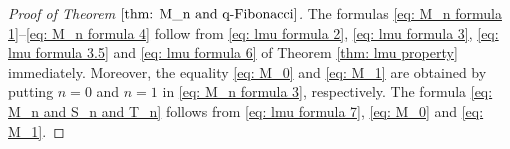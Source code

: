\documentclass[a4paper]{article}
\numberwithin{equation}{section}
\theoremstyle{plain}
\newtheorem{lem}{Lemma}
\newtheorem{coro}{Corollary}
\begin{document}
\begin{proof}[Proof of Theorem $\ref{thm: M_n and q-Fibonacci}$]
The formulas \eqref{eq: M_n formula 1}--\eqref{eq: M_n formula 4} follow from \eqref{eq: lmu formula 2}, \eqref{eq: lmu formula 3}, \eqref{eq: lmu formula 3.5} and \eqref{eq: lmu formula 6} of Theorem \ref{thm: lmu property} immediately. 
Moreover, the equality \eqref{eq: M_0} and \eqref{eq: M_1} are obtained by putting $n=0$ and $n=1$ in \eqref{eq: M_n formula 3}, respectively. 
The formula \eqref{eq: M_n and S_n and T_n} follows from \eqref{eq: lmu formula 7}, \eqref{eq: M_0} and \eqref{eq: M_1}. 
\end{proof}

\end{document}

